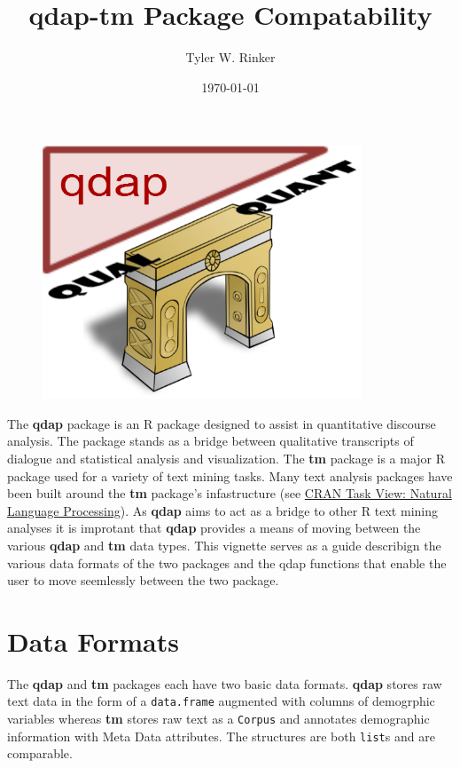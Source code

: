 \documentclass{article}\usepackage[]{graphicx}\usepackage[]{color}
\begin{document}
\title{qdap-tm Package Compatability}
\author{Tyler W. Rinker}
\date{\today}
\maketitle

\vspace{1cm}
\begin{figure}[h!]
  \centering
    \includegraphics[width=3.75in]{../inst/demos/qdap_logo.png}
\end{figure}

The \textbf{qdap} package \citep{R-qdap} is an R package designed to assist in quantitative discourse analysis. The package stands as a bridge between qualitative transcripts of dialogue and statistical analysis and visualization.  The \textbf{tm} package \citep{R-tm} is a major R \citep{R-core} package used for a variety of text mining tasks. Many text analysis packages have been built around the \textbf{tm} package's infastructure (see \href{http://cran.r-project.org/web/views/NaturalLanguageProcessing.html}{CRAN Task View: Natural Language Processing}).  As \textbf{qdap} aims to act as a bridge to other R text mining analyses it is improtant that \textbf{qdap} provides a means of moving between the various \textbf{qdap} and \textbf{tm} data types.  This vignette serves as a guide describign the various data formats of the two packages and the qdap functions that enable the user to move seemlessly between the two package.




\newpage
\section{Data Formats}

\hspace{.4cm} The \textbf{qdap} and \textbf{tm} packages each have two basic data formats.  \textbf{qdap} stores raw text data in the form of a \texttt{data.frame} augmented with columns of demogrphic variables whereas \textbf{tm} stores raw text as a \texttt{Corpus} and annotates demographic information with Meta Data attributes.  The structures are both \texttt{list}s and are comparable.
\end{document}

